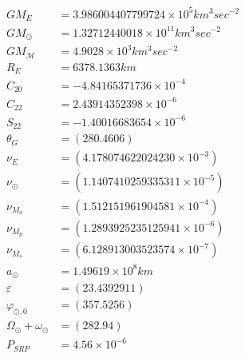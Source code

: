 \documentclass{article}
\begin{document}
\begin{align}
GM_E &=3.986004407799724\times 10^5 km^3 sec^{-2} \\
GM_\odot &= 1.32712440018\times 10^{11}km^3 sec^{-2} \\
GM_{\mathcal M} &=4.9028\times 10^{3}km^3 sec^{-2} \\
R_E &=6378.1363 km\\
C_{20} &= -4.84165371736\times 10^{-4}\\
C_{22} &= 2.43914352398\times 10^{-6}\\
S_{22} &=-1.40016683654\times 10^{-6}\\
\theta_G &= (280.4606)\\
\nu_E  &=(4.178074622024230\times 10^{-3})\\
\nu_\odot &=  (1.1407410259335311\times 10^{-5})\\
\nu_{M_a} &=  (1.512151961904581\times 10^{-4})\\
\nu_{M_p} &=  (1.2893925235125941\times 10^{-6})\\
\nu_{M_s} &=  (6.128913003523574\times 10^{-7})\\
a_\odot &= 1.49619 \times 10^8 km\\
\varepsilon&= (23.4392911)\\
\varphi_{\odot,0} &= (357.5256)\\
\Omega_\odot + \omega_\odot &=  (282.94) \\
P_{SRP} &=4.56\times 10^{-6}
\end{align}
\end{document}

